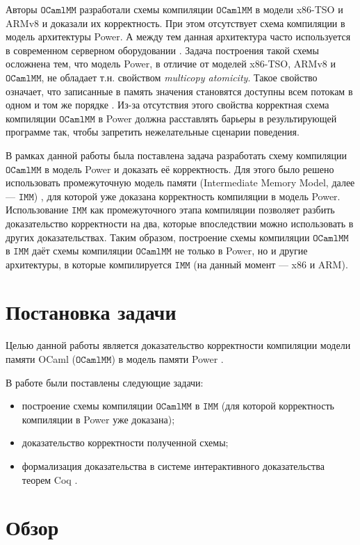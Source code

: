 \documentclass[14pt]{matmex-diploma-custom}
\newcommand{\IMM}{\mathtt{IMM}}
\newcommand{\OMM}{\mathtt{OCaml}\allowbreak \mathtt{MM}}
\newcommand{\defn}[1]{\textit{#1}}
\begin{document}
Авторы $\OMM$ разработали схемы компиляции $\OMM$ в модели x86-TSO и ARMv8 \cite{omm} и доказали их корректность. При этом отсутствует схема компиляции в модель архитектуры Power. А между тем данная архитектура часто используется в современном серверном оборудовании \cite{power-servers}. Задача построения такой схемы осложнена тем, что модель Power, в отличие от моделей x86-TSO, ARMv8 и $\OMM$, не обладает т.н. свойством \defn{multicopy atomicity}. Такое свойство означает, что записанные в память значения становятся доступны всем потокам в одном и том же порядке \cite{arm}. Из-за отсутствия этого свойства корректная схема компиляции $\OMM$ в Power должна расставлять барьеры в результирующей программе так, чтобы запретить нежелательные сценарии поведения. 

В рамках данной работы была поставлена задача разработать схему компиляции $\OMM$ в модель Power и доказать её корректность. Для этого было решено использовать промежуточную модель памяти (Intermediate Memory Model, далее — $\IMM$) \cite{imm}, для которой уже доказана корректность компиляции в модель Power. Использование $\IMM$ как промежуточного этапа компиляции позволяет разбить доказательство корректности  на два, которые впоследствии можно использовать в других доказательствах. Таким образом, построение схемы компиляции $\OMM$ в $\IMM$ даёт схемы компиляции $\OMM$ не только в Power, но и другие архитектуры, в которые компилируется $\IMM$ (на данный момент --- x86 и ARM). 


\section{Постановка задачи}

Целью данной работы является доказательство корректности компиляции модели памяти OCaml ($\OMM$) в модель памяти Power \cite{power}. 

В работе были поставлены следующие задачи:

\begin{itemize}
\item построение схемы компиляции $\OMM$ в $\IMM$ (для которой корректность компиляции в Power уже доказана);
\item доказательство корректности полученной схемы;
\item формализация доказательства в системе интерактивного доказательства теорем Coq \cite{coq-description}.
\end{itemize}

\section{Обзор}
\end{document}

